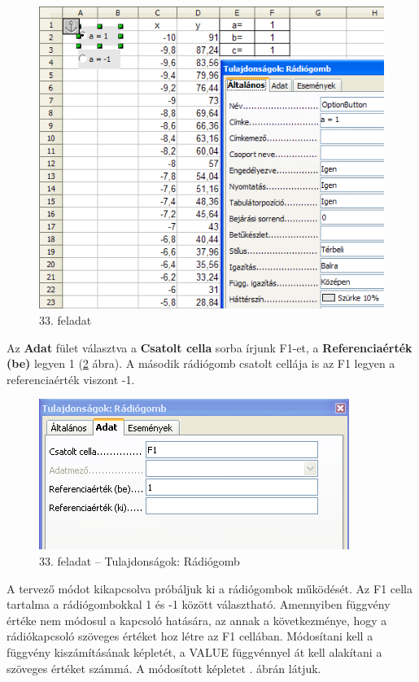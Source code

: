 \begin{figure}[!h]
\begin{center}
\includegraphics[width=12.016cm]{oocalcv1-img152.png}
\caption{33. feladat}\label{33-feladat}
\end{center}
\end{figure}

Az \textbf{Adat} fület választva a \textbf{Csatolt cella} sorba
írjunk F1-et, a \textbf{Referenciaérték (be)} legyen 1 (\ref{33-feladatRádiógomb}
ábra). A második rádiógomb csatolt cellája is az F1 legyen a
referenciaérték viszont -1.

\begin{figure}[!h]
\begin{center}
\includegraphics[width=10.081cm]{oocalcv1-img153.png}
\caption{33. feladat --  Tulajdonságok: Rádiógomb}\label{33-feladatRádiógomb}
\end{center}
\end{figure}

A tervező módot kikapcsolva próbáljuk ki a rádiógombok
működését. Az F1 cella tartalma a rádiógombokkal 1 és
-1 között választható. Amennyiben függvény értéke nem
módosul a kapcsoló hatására, az annak a következménye, hogy
a rádiókapcsoló szöveges értéket hoz létre az F1
cellában. Módosítani kell a függvény kiszámításának
képletét, a VALUE függvénnyel át kell alakítani a
szöveges értéket számmá. A módosított képletet .
ábrán látjuk.

